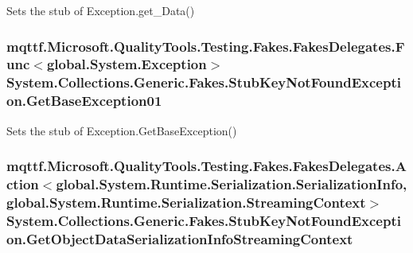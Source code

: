 Sets the stub of Exception.\-get\-\_\-\-Data()

\hypertarget{class_system_1_1_collections_1_1_generic_1_1_fakes_1_1_stub_key_not_found_exception_a2438c8bd972ef2851c1dc56e58b1778f}{
\subsubsection[{Get\-Base\-Exception01}]{\setlength{\rightskip}{0pt plus 5cm}mqttf.\-Microsoft.\-Quality\-Tools.\-Testing.\-Fakes.\-Fakes\-Delegates.\-Func$<$global.\-System.\-Exception$>$ System.\-Collections.\-Generic.\-Fakes.\-Stub\-Key\-Not\-Found\-Exception.\-Get\-Base\-Exception01}}\label{class_system_1_1_collections_1_1_generic_1_1_fakes_1_1_stub_key_not_found_exception_a2438c8bd972ef2851c1dc56e58b1778f}


Sets the stub of Exception.\-Get\-Base\-Exception()

\hypertarget{class_system_1_1_collections_1_1_generic_1_1_fakes_1_1_stub_key_not_found_exception_a7037d3f99217faddd1afb869978cc63d}{
\subsubsection[{Get\-Object\-Data\-Serialization\-Info\-Streaming\-Context}]{\setlength{\rightskip}{0pt plus 5cm}mqttf.\-Microsoft.\-Quality\-Tools.\-Testing.\-Fakes.\-Fakes\-Delegates.\-Action$<$global.\-System.\-Runtime.\-Serialization.\-Serialization\-Info, global.\-System.\-Runtime.\-Serialization.\-Streaming\-Context$>$ System.\-Collections.\-Generic.\-Fakes.\-Stub\-Key\-Not\-Found\-Exception.\-Get\-Object\-Data\-Serialization\-Info\-Streaming\-Context}}\label{class_system_1_1_collections_1_1_generic_1_1_fakes_1_1_stub_key_not_found_exception_a7037d3f99217faddd1afb869978cc63d}


